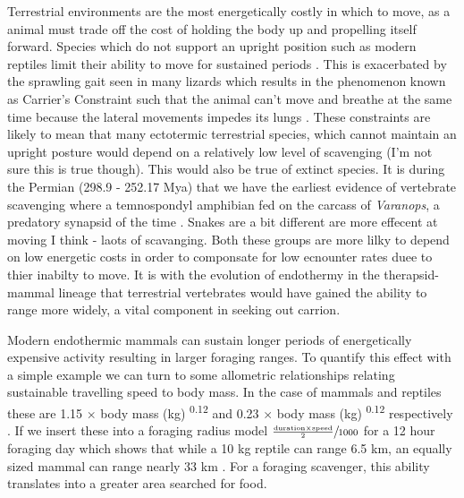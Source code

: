 \documentclass[a4paper,12pt]{article}
\begin{document}
Terrestrial environments are the most energetically costly in which to move, as a animal must trade off the cost of holding the body up and propelling itself forward. Species which do not support an upright position such as modern reptiles limit their ability to move for sustained periods \citep{bennett1979endothermy}. This is exacerbated by the sprawling gait seen in many lizards which results in the phenomenon known as Carrier's Constraint such that the animal can't move and breathe at the same time because the lateral movements impedes its lungs \citep{carrier1987evolution}. These constraints are likely to mean that many ectotermic terrestrial species, which cannot maintain an upright posture would depend on a relatively low level of scavenging (I'm not sure this is true though). This would also be true of extinct species. It is during the Permian (298.9 - 252.17 Mya) that we have the earliest evidence of vertebrate scavenging where a temnospondyl amphibian fed on the carcass of \textit{Varanops}, a predatory synapsid of the time \citep{reisz2006articulated}. 
Snakes are a bit different are more effecent at moving I think - laots of scavanging. Both these groups are more lilky to depend on low energetic costs in order to componsate for low ecnounter rates duee to thier inabilty to move. It is with the evolution of endothermy in the therapsid-mammal lineage \citep{clarke2010temperature} that terrestrial vertebrates would have gained the ability to range more widely, a vital component in seeking out carrion. 


Modern endothermic mammals can sustain longer periods of energetically expensive activity \citep{bennett1979endothermy} resulting in larger foraging ranges. To quantify this effect with a simple example we can turn to some allometric relationships relating sustainable travelling speed to body mass.
In the case of mammals and reptiles these are 1.15 $\times$ body mass (kg) \textsuperscript{0.12} and 0.23 $\times$ body mass (kg) \textsuperscript{0.12} respectively \citep{ruxton2004obligate}.
If we insert these into a foraging radius model $\sfrac{\frac{\text{duration} \times \text{speed}}{2}}{1000}$ for a 12 hour foraging day which shows that while a 10 kg reptile can range 6.5 km, an equally sized mammal can range nearly 33 km \citep{Enstipp2006Energetics}. 
For a foraging scavenger, this ability translates into a greater area searched for food. 
\end{document}

